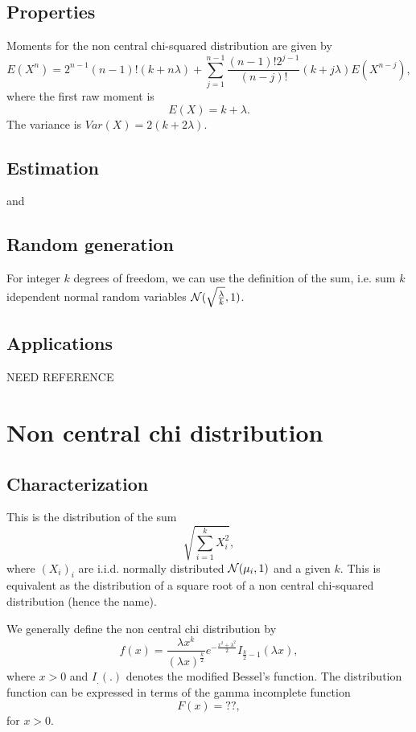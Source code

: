 \subsection{Properties}
Moments for the non central chi-squared distribution are given by
$$
E(X^n) = 2^{n-1}(n-1)!(k+n\lambda)+\sum_{j=1}^{n-1} \frac{(n-1)!2^{j-1}}{(n-j)!}(k+j\lambda )E(X^{n-j}),
$$
where the first raw moment is
$$
E(X) = k+\lambda. 
$$
The variance is $Var(X) = 2(k+2\lambda)$.


\subsection{Estimation}
\cite{liyu} and \cite{saxena}

\subsection{Random generation}
For integer $k$ degrees of freedom, we can use the definition of the sum, i.e. sum $k$ idependent normal random variables $\mathcal N(\sqrt{\frac{\lambda}{k}},1)$.

\subsection{Applications}
NEED REFERENCE

\section{Non central chi distribution}
\subsection{Characterization}

This is the distribution of the sum
$$
\sqrt{\sum_{i=1}^k X_i^2},
$$
where $(X_i)_i$ are i.i.d. normally distributed $\mathcal N(\mu_i,1)$ and a given $k$. This is equivalent as the distribution of a square root of a non central chi-squared distribution (hence the name). 

We generally define the non central chi distribution by
$$
f(x) = \frac{\lambda x^{k}}{(\lambda x)^{\frac{k}{2}} } e^{-\frac{x^2+\lambda^2}{2}} I_{\frac{k}{2}-1}(\lambda x),
$$
where $x>0$ and $I_.(.)$ denotes the modified Bessel's function.
The distribution function can be expressed in terms of the gamma incomplete function
$$
F(x) = ??,
$$
for $x>0$. 




